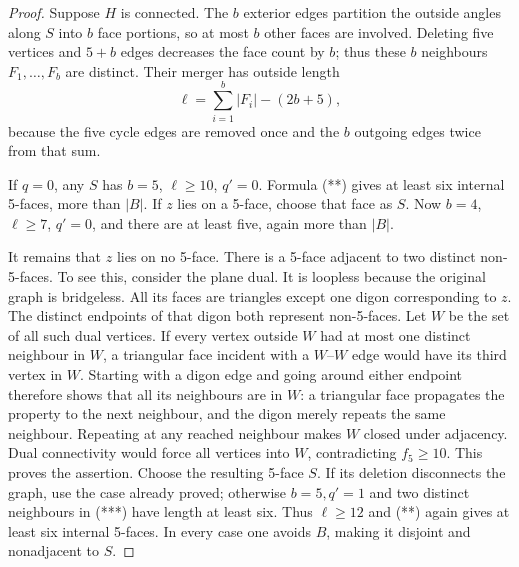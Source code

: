 \documentclass[11pt]{article}
\theoremstyle{remark}
\numberwithin{equation}{section}
\begin{document}
\begin{proof}
Suppose $H$ is connected. The $b$ exterior edges partition the
outside angles along $S$ into $b$ face portions, so at most $b$
other faces are involved. Deleting five vertices and $5+b$ edges
decreases the face count by $b$; thus these $b$ neighbours
$F_1,\ldots,F_b$ are distinct. Their merger has outside length
\[
 \ell=\sum_{i=1}^b|F_i|-(2b+5),                       \tag{***}
\]
because the five cycle edges are removed once and the $b$ outgoing
edges twice from that sum.

If $q=0$, any $S$ has $b=5$, $\ell\ge10$, $q'=0$.
Formula (**) gives at least six internal 5-faces, more than $|B|$.
If $z$ lies on a 5-face, choose that face as $S$. Now $b=4$,
$\ell\ge7$, $q'=0$, and there are at least five, again more than $|B|$.

It remains that $z$ lies on no 5-face. There is a 5-face adjacent
to two distinct non-5-faces. To see this, consider the plane dual.
It is loopless because the original graph is bridgeless.
All its faces are triangles except one digon corresponding to $z$.
The distinct endpoints of that digon both represent non-5-faces.
Let $W$ be the set of all such dual vertices. If every vertex outside
$W$ had at most one distinct neighbour in $W$, a triangular face
incident with a $W$--$W$ edge would have its third vertex in $W$.
Starting with a digon edge and going around either endpoint therefore
shows that all its neighbours are in $W$: a triangular face propagates
the property to the next neighbour, and the digon merely repeats the
same neighbour. Repeating at any reached neighbour makes $W$ closed
under adjacency. Dual connectivity would force all vertices into $W$,
contradicting $f_5\ge10$. This proves the assertion.
Choose the resulting 5-face $S$. If its deletion disconnects the graph,
use the case already proved; otherwise $b=5,q'=1$ and two distinct
neighbours in (***) have length at least six. Thus $\ell\ge12$ and
(**) again gives at least six internal 5-faces. In every case one
avoids $B$, making it disjoint and nonadjacent to $S$.
\end{proof}
\end{document}
